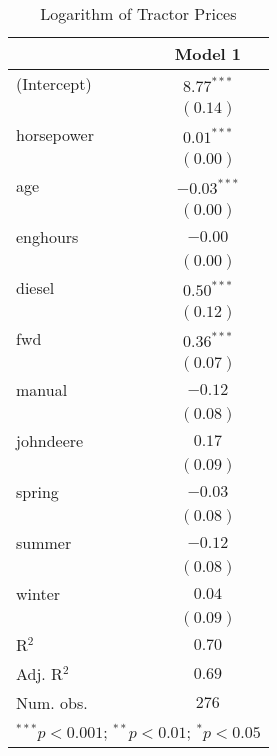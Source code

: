 
\begin{table}
\begin{center}
\begin{tabular}{l c}
\hline
 & Model 1 \\
\hline
(Intercept) & $8.77^{***}$  \\
            & $(0.14)$      \\
horsepower  & $0.01^{***}$  \\
            & $(0.00)$      \\
age         & $-0.03^{***}$ \\
            & $(0.00)$      \\
enghours    & $-0.00$       \\
            & $(0.00)$      \\
diesel      & $0.50^{***}$  \\
            & $(0.12)$      \\
fwd         & $0.36^{***}$  \\
            & $(0.07)$      \\
manual      & $-0.12$       \\
            & $(0.08)$      \\
johndeere   & $0.17$        \\
            & $(0.09)$      \\
spring      & $-0.03$       \\
            & $(0.08)$      \\
summer      & $-0.12$       \\
            & $(0.08)$      \\
winter      & $0.04$        \\
            & $(0.09)$      \\
\hline
R$^2$       & $0.70$        \\
Adj. R$^2$  & $0.69$        \\
Num. obs.   & $276$         \\
\hline
\multicolumn{2}{l}{\scriptsize{$^{***}p<0.001$; $^{**}p<0.01$; $^{*}p<0.05$}}
\end{tabular}
\caption{Logarithm of Tractor Prices}
\label{tab:log_price_reg_2}
\end{center}
\end{table}
